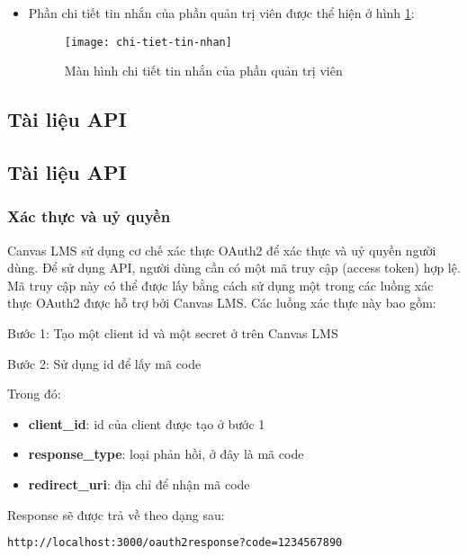 \documentclass[../Thesis.tex]{subfiles}
\begin{document}
\begin{itemize}
                \item Phần chi tiết tin nhắn của phần quản trị viên được thể hiện ở hình \ref{fig:chi-tiet-tin-nhan}:
                \begin{figure}[hbt!]
                    \centering\texttt{[image: chi-tiet-tin-nhan]}
                    \caption{Màn hình chi tiết tin nhắn của phần quản trị viên}
                    \label{fig:chi-tiet-tin-nhan}
                \end{figure}
                \FloatBarrier
        \end{itemize}

    \subsection{Tài liệu API}
    \subsection{Tài liệu API}
    \subsubsection{Xác thực và uỷ quyền}
      Canvas LMS sử dụng cơ chế xác thực OAuth2 để xác thực và uỷ quyền người dùng. Để sử dụng API, người dùng cần có một mã truy cập (access token) hợp lệ. Mã truy cập này có thể được lấy bằng cách sử dụng một trong các luồng xác thực OAuth2 được hỗ trợ bởi Canvas LMS. Các luồng xác thực này bao gồm:
      
      Bước 1: Tạo một client id và một secret ở trên Canvas LMS
      
      Bước 2: Sử dụng id để lấy mã code
     
        Trong đó:
        \begin{itemize}
          \item \textbf{client\_id}: id của client được tạo ở bước 1
          \item \textbf{response\_type}: loại phản hồi, ở đây là mã code
          \item \textbf{redirect\_uri}: địa chỉ để nhận mã code
        \end{itemize}

        Response sẽ được trả về theo dạng sau:
        \begin{lstlisting}[language=bash]
          http://localhost:3000/oauth2response?code=1234567890
        \end{lstlisting}
\end{document}

